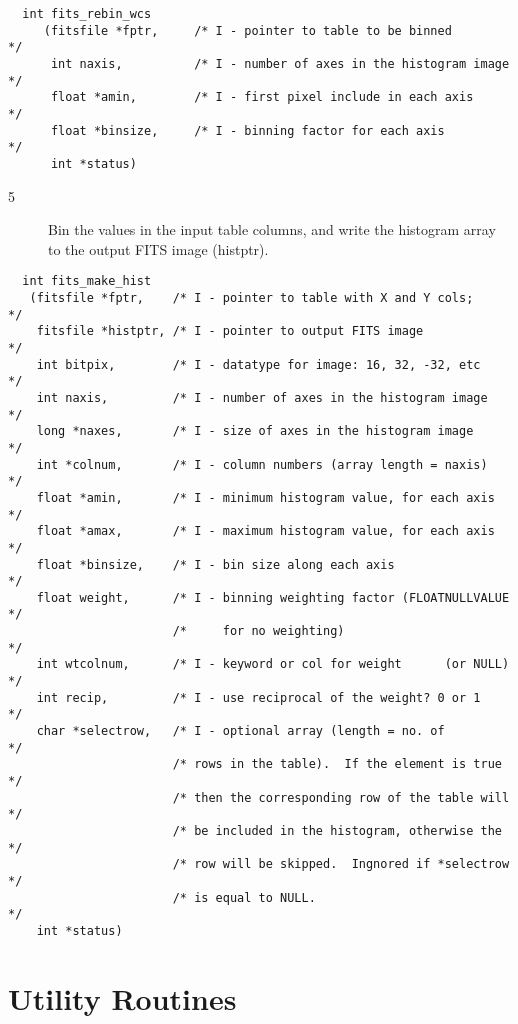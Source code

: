 \documentclass[11pt]{book}
\begin{document}
\begin{verbatim}
  int fits_rebin_wcs
     (fitsfile *fptr,     /* I - pointer to table to be binned           */
      int naxis,          /* I - number of axes in the histogram image   */
      float *amin,        /* I - first pixel include in each axis        */
      float *binsize,     /* I - binning factor for each axis            */
      int *status)
\end{verbatim}


\begin{description}
\item[5 ] Bin the values in the input table columns, and write the histogram
array to the output FITS image (histptr).
 \label{makehist}
\end{description}

\begin{verbatim}
  int fits_make_hist
   (fitsfile *fptr,    /* I - pointer to table with X and Y cols;      */
    fitsfile *histptr, /* I - pointer to output FITS image             */
    int bitpix,        /* I - datatype for image: 16, 32, -32, etc     */
    int naxis,         /* I - number of axes in the histogram image    */
    long *naxes,       /* I - size of axes in the histogram image      */
    int *colnum,       /* I - column numbers (array length = naxis)    */
    float *amin,       /* I - minimum histogram value, for each axis   */
    float *amax,       /* I - maximum histogram value, for each axis   */
    float *binsize,    /* I - bin size along each axis                 */
    float weight,      /* I - binning weighting factor (FLOATNULLVALUE */
                       /*     for no weighting)                        */
    int wtcolnum,      /* I - keyword or col for weight      (or NULL) */
    int recip,         /* I - use reciprocal of the weight? 0 or 1     */
    char *selectrow,   /* I - optional array (length = no. of          */
                       /* rows in the table).  If the element is true  */
                       /* then the corresponding row of the table will */
                       /* be included in the histogram, otherwise the  */
                       /* row will be skipped.  Ingnored if *selectrow */
                       /* is equal to NULL.                            */
    int *status)
\end{verbatim}



\section{Utility Routines}
\end{document}

